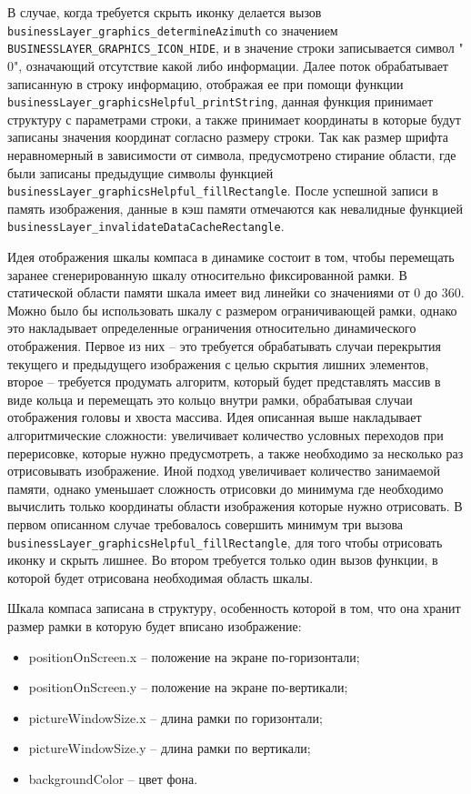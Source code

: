 В случае, когда требуется скрыть иконку делается вызов \lstinline{businessLayer_graphics_determineAzimuth} со значением \lstinline{BUSINESSLAYER_GRAPHICS_ICON_HIDE},
и в значение строки записывается символ "\\0", означающий отсутствие какой либо информации. Далее поток обрабатывает записанную в строку информацию, отображая ее
при помощи функции \lstinline{businessLayer_graphicsHelpful_printString}, данная функция принимает структуру с параметрами строки, а также принимает координаты
в которые будут записаны значения координат согласно размеру строки. Так как размер шрифта неравномерный в зависимости от символа, предусмотрено стирание области,
где были записаны предыдущие символы функцией \lstinline{businessLayer_graphicsHelpful_fillRectangle}. После успешной записи в память изображения, данные в кэш памяти
отмечаются как невалидные функцией \lstinline{businessLayer_invalidateDataCacheRectangle}.

Идея отображения шкалы компаса в динамике состоит в том, чтобы перемещать заранее сгенерированную шкалу относительно фиксированной рамки. В статической области памяти
шкала имеет вид линейки со значениями от 0 до 360. Можно было бы использовать шкалу с размером ограничивающей рамки, однако это накладывает определенные ограничения относительно
динамического отображения. Первое из них -- это требуется обрабатывать случаи перекрытия текущего и предыдущего изображения с целью скрытия лишних элементов, второе --
требуется продумать алгоритм, который будет представлять массив в виде кольца и перемещать это кольцо внутри рамки, обрабатывая случаи отображения головы и хвоста массива.
Идея описанная выше накладывает алгоритмические сложности: увеличивает количество условных переходов при перерисовке, которые нужно предусмотреть, а также необходимо за несколько
раз отрисовывать изображение. Иной подход увеличивает количество занимаемой памяти, однако уменьшает сложность отрисовки до минимума где необходимо вычислить только координаты
области изображения которые нужно отрисовать. В первом описанном случае требовалось совершить минимум три вызова \lstinline{businessLayer_graphicsHelpful_fillRectangle}, для
того чтобы отрисовать иконку и скрыть лишнее. Во втором требуется только один вызов функции, в которой будет отрисована необходимая область шкалы.

Шкала компаса записана в структуру, особенность которой в том, что она хранит размер рамки в которую будет вписано изображение:

\begin{itemize}
    \item positionOnScreen.x -- положение на экране по-горизонтали;
    \item positionOnScreen.y -- положение на экране по-вертикали;
    \item pictureWindowSize.x -- длина рамки по горизонтали;
    \item pictureWindowSize.y -- длина рамки по вертикали;
    \item backgroundColor -- цвет фона.
\end{itemize}

